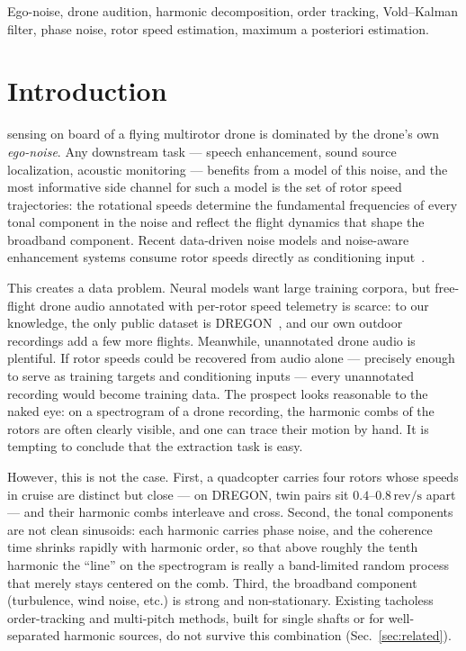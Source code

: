 \documentclass[journal]{IEEEtran}
\newcommand{\revps}{\ensuremath{\,\mathrm{rev/s}}}
\begin{document}
\begin{IEEEkeywords}
Ego-noise, drone audition, harmonic decomposition, order tracking,
Vold--Kalman filter, phase noise, rotor speed estimation, maximum a
posteriori estimation.
\end{IEEEkeywords}

\section{Introduction}
\label{sec:intro}

 sensing on board of a flying multirotor drone
is dominated by the drone's own \emph{ego-noise}. Any downstream task ---
speech enhancement, sound source localization, acoustic monitoring ---
benefits from a model of this noise, and the most informative side
channel for such a model is the set of rotor speed trajectories: the
rotational speeds determine the fundamental frequencies of every tonal
component in the noise and reflect the flight dynamics that shape the
broadband component. Recent data-driven noise models and noise-aware
enhancement systems consume rotor speeds directly as conditioning
input~\cite{yen2023ncm,gulli2025rotorcond}.

This creates a data problem. Neural models want large training corpora,
but free-flight drone audio annotated with per-rotor speed telemetry is
scarce: to our knowledge, the only public dataset is
DREGON~\cite{strauss2018dregon}, and our own outdoor recordings add a few
more flights. Meanwhile, unannotated drone audio is plentiful. If rotor
speeds could be recovered from audio alone --- precisely enough to serve
as training targets and conditioning inputs --- every unannotated
recording would become training data. The prospect looks reasonable to
the naked eye: on a spectrogram of a drone recording, the harmonic combs
of the rotors are often clearly visible, and one can trace their motion
by hand. It is tempting to conclude that the extraction task is easy.

However, this is not the case. First, a quadcopter carries
four rotors whose speeds in cruise are distinct but close --- on DREGON,
twin pairs sit $0.4$--$0.8\revps$ apart --- and their harmonic combs
interleave and cross. Second, the tonal components are not clean
sinusoids: each harmonic carries phase noise, and the coherence time
shrinks rapidly with harmonic order, so that above roughly the tenth
harmonic the ``line'' on the spectrogram is really a band-limited random
process that merely stays centered on the comb. Third, the broadband
component (turbulence, wind noise, etc.) is strong and non-stationary.
Existing tacholess order-tracking and
multi-pitch methods, built for single shafts or for well-separated
harmonic sources, do not survive this combination
(Sec.~\ref{sec:related}).
\end{document}

